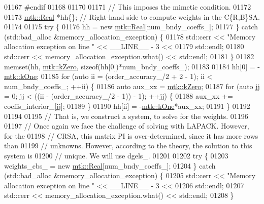 \begin{DoxyCode}
{{01167 \textcolor{preprocessor}{  #endif}
01168 
01170 
01171   \textcolor{comment}{// This imposes the mimetic condition.}
01172 
01173   \hyperlink{group__c01-roots_gac080bbbf5cbb5502c9f00405f894857d}{mtk::Real} *hh\{\};  \textcolor{comment}{// Right-hand side to compute weights in the C\{R,B\}SA.}
01174 
01175   \textcolor{keywordflow}{try} \{
01176     hh = \textcolor{keyword}{new} \hyperlink{group__c01-roots_gac080bbbf5cbb5502c9f00405f894857d}{mtk::Real}[num\_bndy\_coeffs\_];
01177   \} \textcolor{keywordflow}{catch} (std::bad\_alloc &memory\_allocation\_exception) \{
01178     std::cerr << \textcolor{stringliteral}{"Memory allocation exception on line "} << \_\_LINE\_\_ - 3 <<
01179       std::endl;
01180     std::cerr << memory\_allocation\_exception.what() << std::endl;
01181   \}
01182   memset(hh, \hyperlink{group__c01-roots_ga59a451a5fae30d59649bcda274fea271}{mtk::kZero}, \textcolor{keyword}{sizeof}(hh[0])*num\_bndy\_coeffs\_);
01183 
01184   hh[0] = -\hyperlink{group__c01-roots_ga26407c24d43b6b95480943340d285c71}{mtk::kOne};
01185   \textcolor{keywordflow}{for} (\textcolor{keyword}{auto} ii = (order\_accuracy\_/2 + 2 - 1); ii < num\_bndy\_coeffs\_; ++ii) \{
01186     \textcolor{keyword}{auto} aux\_xx = \hyperlink{group__c01-roots_ga59a451a5fae30d59649bcda274fea271}{mtk::kZero};
01187     \textcolor{keywordflow}{for} (\textcolor{keyword}{auto} jj = 0; jj < ((ii - (order\_accuracy\_/2 - 1)) - 1); ++jj) \{
01188       aux\_xx += coeffs\_interior\_[jj];
01189     \}
01190     hh[ii] = -\hyperlink{group__c01-roots_ga26407c24d43b6b95480943340d285c71}{mtk::kOne}*aux\_xx;
01191   \}
01192 
01194 
01195   \textcolor{comment}{// That is, we construct a system, to solve for the weights.}
01196 
01197   \textcolor{comment}{// Once again we face the challenge of solving with LAPACK. However, for the}
01198   \textcolor{comment}{// CRSA, this matrix PI is over-determined, since it has more rows than}
01199   \textcolor{comment}{// unknowns. However, according to the theory, the solution to this system is}
01200   \textcolor{comment}{// unique. We will use dgels\_.}
01201 
01202   \textcolor{keywordflow}{try} \{
01203     weights\_cbs\_ = \textcolor{keyword}{new} \hyperlink{group__c01-roots_gac080bbbf5cbb5502c9f00405f894857d}{mtk::Real}[num\_bndy\_coeffs\_];
01204   \} \textcolor{keywordflow}{catch} (std::bad\_alloc &memory\_allocation\_exception) \{
01205     std::cerr << \textcolor{stringliteral}{"Memory allocation exception on line "} << \_\_LINE\_\_ - 3 <<
01206       std::endl;
01207     std::cerr << memory\_allocation\_exception.what() << std::endl;
01208   \}
}}
\end{DoxyCode}
